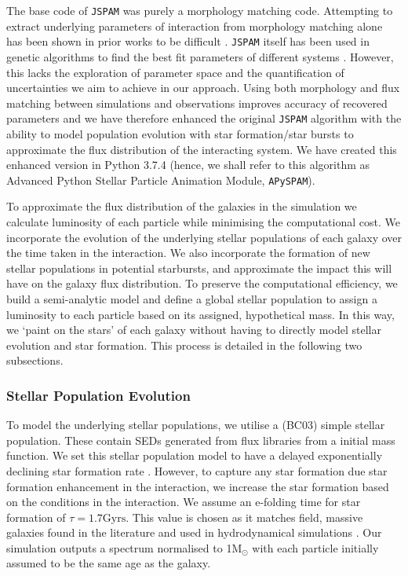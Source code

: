 The base code of \texttt{JSPAM} was purely a morphology matching code. Attempting to extract underlying parameters of interaction from morphology matching alone has been shown in prior works to be difficult \citep[e.g.][]{2009AJ....137.3071B}. \texttt{JSPAM} itself has been used in genetic algorithms to find the best fit parameters of different systems \citep[e.g][]{2023A&C....4200691W}. However, this lacks the exploration of parameter space and the quantification of uncertainties we aim to achieve in our approach. Using both morphology and flux matching between simulations and observations improves accuracy of recovered parameters \citep{2021ApJ...923..124M} and we have therefore enhanced the original \texttt{JSPAM} algorithm with the ability to model population evolution with star formation/star bursts to approximate the flux distribution of the interacting system. We have created this enhanced version in Python 3.7.4 (hence, we shall refer to this algorithm as Advanced Python Stellar Particle Animation Module, \texttt{APySPAM}).

To approximate the flux distribution of the galaxies in the simulation we calculate luminosity of each particle while minimising the computational cost. We incorporate the evolution of the underlying stellar populations of each galaxy over the time taken in the interaction. We also incorporate the formation of new stellar populations in potential starbursts, and approximate the impact this will have on the galaxy flux distribution. To preserve the computational efficiency, we build a semi-analytic model and define a global stellar population to assign a luminosity to each particle based on its assigned, hypothetical mass. In this way, we `paint on the stars' of each galaxy without having to directly model stellar evolution and star formation. This process is detailed in the following two subsections. 

\subsubsection{Stellar Population Evolution}\label{Stellar_Pop_Evol}
To model the underlying stellar populations, we utilise a \citet{2003MNRAS.344.1000B} (BC03) simple stellar population. These contain SEDs generated from flux libraries from a \citet{2003PASP..115..763C} initial mass function. We set this stellar population model to have a delayed exponentially declining star formation rate \citep{2009ApJ...690..802J, 2013ApJ...762L..15P,2014arXiv1404.0402S, 2019A&A...622A.103B}. However, to capture any star formation due star formation enhancement in the interaction, we increase the star formation based on the conditions in the interaction. We assume an e-folding time for star formation of $\tau = 1.7\text{Gyrs}$. This value is chosen as it matches field, massive galaxies found in the literature \citep[e.g][]{2010ApJ...721..193P} and used in hydrodynamical simulations \citep[e.g.][]{2022ApJ...941....5J}. Our simulation outputs a spectrum normalised to 1M$_{\odot}$ with each particle initially assumed to be the same age as the galaxy.

